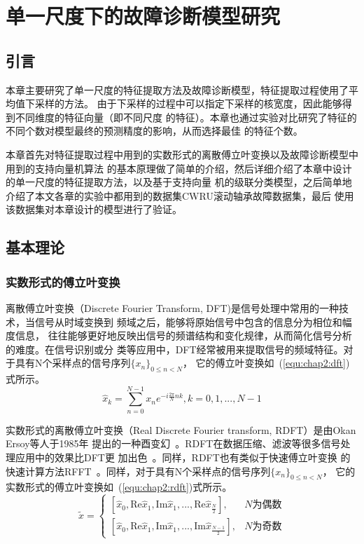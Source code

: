 \chapter{单一尺度下的故障诊断模型研究}
\label{cha:chapter2}

\section{引言}

本章主要研究了单一尺度的特征提取方法及故障诊断模型，特征提取过程使用了平均值下采样的方法。
由于下采样的过程中可以指定下采样的核宽度，因此能够得到不同维度的特征向量（即不同尺度
的特征）。本章也通过实验对比研究了特征的不同个数对模型最终的预测精度的影响，从而选择最佳
的特征个数。

本章首先对特征提取过程中用到的实数形式的离散傅立叶变换以及故障诊断模型中用到的支持向量机算法
的基本原理做了简单的介绍，然后详细介绍了本章中设计的单一尺度的特征提取方法，以及基于支持向量
机的级联分类模型，之后简单地介绍了本文各章的实验中都用到的数据集CWRU滚动轴承故障数据集，最后
使用该数据集对本章设计的模型进行了验证。

\section{基本理论}

\subsection{实数形式的傅立叶变换}
\label{subsection:rdft}

离散傅立叶变换（Discrete Fourier Transform, DFT)是信号处理中常用的一种技术，当信号从时域变换到
频域之后，能够将原始信号中包含的信息分为相位和幅度信息，
往往能够更好地反映出信号的频谱结构和变化规律，从而简化信号分析的难度。在信号识别或分
类等应用中，DFT经常被用来提取信号的频域特征。对于具有N个采样点的信号序列$\{x_n\}_{0\leq n < N}$，
它的傅立叶变换如~(\ref{equ:chap2:dft})式所示。
\begin{equation}
\label{equ:chap2:dft}
  \hat{x}_k=\sum_{n=0}^{N-1}x_n e^{-i\frac{2\pi}{N}nk}, k=0,1,...,N-1
\end{equation}

实数形式的离散傅立叶变换（Real Discrete Fourier transform, RDFT）是由Okan Ersoy等人于1985年
提出的一种酉变幻~\cite{ersoy1985real}。RDFT在数据压缩、滤波等很多信号处理应用中的效果比DFT更
加出色~\cite{ersoy1988fast}。同样，RDFT也有类似于快速傅立叶变换
的快速计算方法RFFT~\cite{ersoy1988fast}。同样，对于具有N个采样点的信号序列$\{x_n\}_{0\leq n < N}$，
它的实数形式的傅立叶变换如~(\ref{equ:chap2:rdft})式所示。
\begin{equation}
\label{equ:chap2:rdft}
  \widetilde{x}=
  \begin{cases}
    \left[\hat{x}_0, \text{Re}\hat{x}_1, \text{Im}\hat{x}_1, ..., \text{Re}\hat{x}_{\frac{N}{2}}\right],  & N\text{为偶数}\\
    \left[\hat{x}_0, \text{Re}\hat{x}_1, \text{Im}\hat{x}_1, ..., \text{Im}\hat{x}_{\frac{N-1}{2}}\right],& N\text{为奇数}
  \end{cases}
\end{equation}

